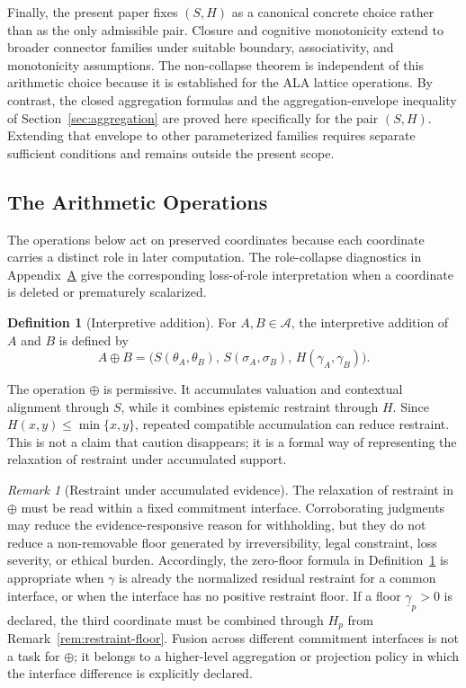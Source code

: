 \documentclass[reqno,final]{amsart}
\theoremstyle{definition}
\newtheorem{definition}{Definition}
\theoremstyle{plain}
\theoremstyle{remark}
\newtheorem{remark}{Remark}
\providecommand{\cA}{\mathcal{A}}
\begin{document}
Finally, the present paper fixes \((S,H)\) as a canonical concrete choice rather than as the only admissible pair. Closure and cognitive monotonicity extend to broader connector families under suitable boundary, associativity, and monotonicity assumptions. The non-collapse theorem is independent of this arithmetic choice because it is established for the ALA lattice operations. By contrast, the closed aggregation formulas and the aggregation-envelope inequality of Section~\ref{sec:aggregation} are proved here specifically for the pair \((S,H)\). Extending that envelope to other parameterized families requires separate sufficient conditions and remains outside the present scope.

\subsection{The Arithmetic Operations}
The operations below act on preserved coordinates because each coordinate carries a distinct role in later computation. The role-collapse diagnostics in Appendix~\hyperref[app:diagnostic-details]{A} give the corresponding loss-of-role interpretation when a coordinate is deleted or prematurely scalarized.

\begin{definition}[Interpretive addition]
\label{def:interpretive-addition}
For \(A,B\in\cA\), the interpretive addition of \(A\) and \(B\) is defined by
\[
A\oplus B
=
\big(S(\theta_A,\theta_B),\,S(\sigma_A,\sigma_B),\,H(\gamma_A,\gamma_B)\big).
\]
\end{definition}

The operation \(\oplus\) is permissive. It accumulates valuation and contextual alignment through \(S\), while it combines epistemic restraint through \(H\). Since \(H(x,y)\le \min\{x,y\}\), repeated compatible accumulation can reduce restraint. This is not a claim that caution disappears; it is a formal way of representing the relaxation of restraint under accumulated support.

\begin{remark}[Restraint under accumulated evidence]
\label{rem:restraint-accumulation}
The relaxation of restraint in \(\oplus\) must be read within a fixed commitment interface. Corroborating judgments may reduce the evidence-responsive reason for withholding, but they do not reduce a non-removable floor generated by irreversibility, legal constraint, loss severity, or ethical burden. Accordingly, the zero-floor formula in Definition~\ref{def:interpretive-addition} is appropriate when \(\gamma\) is already the normalized residual restraint for a common interface, or when the interface has no positive restraint floor. If a floor \(\underline{\gamma}_p>0\) is declared, the third coordinate must be combined through \(H_p\) from Remark~\ref{rem:restraint-floor}. Fusion across different commitment interfaces is not a task for \(\oplus\); it belongs to a higher-level aggregation or projection policy in which the interface difference is explicitly declared.
\end{remark}
\end{document}
